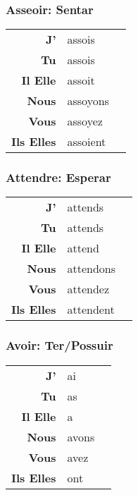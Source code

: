 \documentclass{subfiles}
\begin{document}
\begin{multicols}{3}
        \subsubsection{Asseoir: Sentar}
            \begin{tabular}{r l r}
                \textbf{J'}        & assois   &\\
                \textbf{Tu}        & assois   &\\
                \textbf{Il Elle}   & assoit   &\\
                \textbf{Nous}      & assoyons &\\
                \textbf{Vous}      & assoyez  &\\
                \textbf{Ils Elles} & assoient &
            \end{tabular}

        \subsubsection{Attendre: Esperar}
            \begin{tabular}{r l r}
                \textbf{J'}        & attends   &\\
                \textbf{Tu}        & attends   &\\
                \textbf{Il Elle}   & attend    &\\
                \textbf{Nous}      & attendons &\\
                \textbf{Vous}      & attendez  &\\
                \textbf{Ils Elles} & attendent &
            \end{tabular}

        \subsubsection{Avoir: Ter/Possuir}
            \begin{tabular}{r l r}
                \textbf{J'}        & ai    &\\
                \textbf{Tu}        & as    &\\
                \textbf{Il Elle}   & a     &\\
                \textbf{Nous}      & avons &\\
                \textbf{Vous}      & avez  &\\
                \textbf{Ils Elles} & ont   &
            \end{tabular}


\end{multicols}
\end{document}
